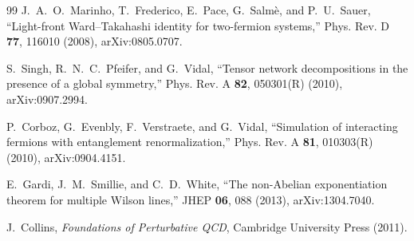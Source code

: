 \documentclass[11pt]{article}
\begin{document}
\begin{thebibliography}{99}
J.~A.~O.~Marinho, T.~Frederico, E.~Pace, G.~Salm\`e, and P.~U.~Sauer,
``Light-front Ward--Takahashi identity for two-fermion systems,''
Phys. Rev. D \textbf{77}, 116010 (2008),
arXiv:0805.0707.

S.~Singh, R.~N.~C.~Pfeifer, and G.~Vidal,
``Tensor network decompositions in the presence of a global symmetry,''
Phys. Rev. A \textbf{82}, 050301(R) (2010),
arXiv:0907.2994.

P.~Corboz, G.~Evenbly, F.~Verstraete, and G.~Vidal,
``Simulation of interacting fermions with entanglement renormalization,''
Phys. Rev. A \textbf{81}, 010303(R) (2010),
arXiv:0904.4151.

E.~Gardi, J.~M.~Smillie, and C.~D.~White,
``The non-Abelian exponentiation theorem for multiple Wilson lines,''
JHEP \textbf{06}, 088 (2013),
arXiv:1304.7040.

J.~Collins,
\emph{Foundations of Perturbative QCD},
Cambridge University Press (2011).

\end{thebibliography}
\end{document}
